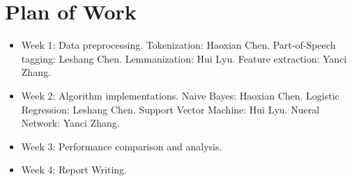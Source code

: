 \section{Plan of Work}
\begin{itemize}
  \item Week 1: Data preprocessing. 
      Tokenization: Haoxian Chen.
      Part-of-Speech tagging: Leshang Chen.
      Lemmanization: Hui Lyu.
      Feature extraction: Yanci Zhang.
  \item Week 2: Algorithm implementations.
      Naive Bayes: Haoxian Chen.
      Logistic Regression: Leshang Chen.
      Support Vector Machine: Hui Lyu.
      Nueral Network: Yanci Zhang.
  \item Week 3: Performance comparison and analysis. 
  \item Week 4: Report Writing.
\end{itemize}
